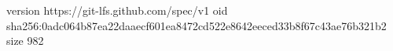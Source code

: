 version https://git-lfs.github.com/spec/v1
oid sha256:0adc064b87ea22daaecf601ea8472cd522e8642eeced33b8f67c43ae76b321b2
size 982
